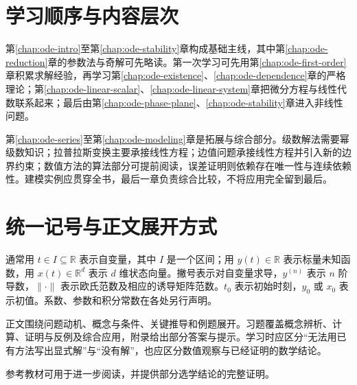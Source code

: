 \section*{学习顺序与内容层次}
第\ref{chap:ode-intro}至第\ref{chap:ode-stability}章构成基础主线，其中第\ref{chap:ode-reduction}章的参数法与奇解可先略读。第一次学习可先用第\ref{chap:ode-first-order}章积累求解经验，再学习第\ref{chap:ode-existence}、\ref{chap:ode-dependence}章的严格理论；第\ref{chap:ode-linear-scalar}、\ref{chap:ode-linear-system}章把微分方程与线性代数联系起来；最后由第\ref{chap:ode-phase-plane}、\ref{chap:ode-stability}章进入非线性问题。

第\ref{chap:ode-series}至第\ref{chap:ode-modeling}章是拓展与综合部分。级数解法需要幂级数知识；拉普拉斯变换主要承接线性方程；边值问题承接线性方程并引入新的边界约束；数值方法的算法部分可提前阅读，误差证明则依赖存在唯一性与连续依赖性。建模实例应贯穿全书，最后一章负责综合比较，不将应用完全留到最后。

\section*{统一记号与正文展开方式}
通常用 $t\in I\subseteq\mathbb{R}$ 表示自变量，其中 $I$ 是一个区间；用 $y(t)\in\mathbb{R}$ 表示标量未知函数，用 $x(t)\in\mathbb{R}^d$ 表示 $d$ 维状态向量。撇号表示对自变量求导，$y^{(n)}$ 表示 $n$ 阶导数，$\|\cdot\|$ 表示欧氏范数及相应的诱导矩阵范数。$t_0$ 表示初始时刻，$y_0$ 或 $x_0$ 表示初值。系数、参数和积分常数在各处另行声明。

正文围绕问题动机、概念与条件、关键推导和例题展开。习题覆盖概念辨析、计算、证明与反例及综合应用，附录给出部分答案与提示。学习时应区分“无法用已有方法写出显式解”与“没有解”，也应区分数值观察与已经证明的数学结论。

参考教材\cite{lebl-diffyqs,teschl-ode}可用于进一步阅读，并提供部分选学结论的完整证明。

